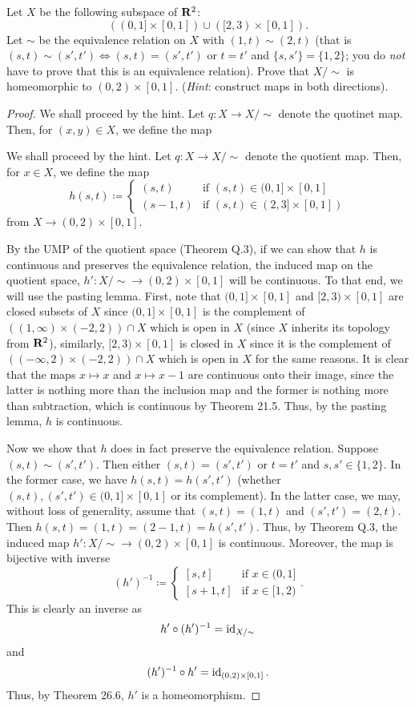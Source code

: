 \begin{problem}
Let $X$ be the following subspace of $\mathbf{R}^2$:
\[
((0,1]\times[0,1])\cup([2,3)\times[0,1]).
\]
Let $\sim$ be the equivalence relation on $X$ with $(1,t)\sim(2,t)$ (that
is $(s,t)\sim(s',t')\iff(s,t)=(s',t')$ or $t=t'$ and $\{s,s'\}=\{1,2\}$;
you do \emph{not} have to prove that this is an equivalence
relation). Prove that $X/{\sim}$ is homeomorphic to
$(0,2)\times[0,1]$. (\emph{Hint}: construct maps in both directions).
\end{problem}
\begin{proof}
We shall proceed by the hint. Let $q\colon X\to X/{\sim}$ denote the
quotinet map. Then, for $(x,y)\in X$, we define the map

We shall proceed by the hint. Let $q\colon X\to X/{\sim}$ denote the
quotient map. Then, for $x\in X$, we define the map
\[
h(s,t)\coloneqq
\begin{cases}
(s,t)&\text{if $(s,t)\in(0,1]\times[0,1]$}\\
(s-1,t)&\text{if $(s,t)\in(2,3]\times[0,1])$}
\end{cases}
\]
from $X\to(0,2)\times[0,1]$.

By the UMP of the quotient space (Theorem Q.3), if we can show that $h$ is
continuous and preserves the equivalence relation, the induced map on the
quotient space, $h'\colon X/{\sim}\to (0,2)\times[0,1]$ will be
continuous. To that end, we will use the pasting lemma. First, note that
$(0,1]\times[0,1]$ and $[2,3)\times[0,1]$ are closed subsets of $X$ since
$(0,1]\times[0,1]$ is the complement of $((1,\infty)\times (-2,2))\cap X$
which is open in $X$ (since $X$ inherits its topology from $\mathbf{R}^2$),
similarly, $[2,3)\times[0,1]$ is closed in $X$ since it is the complement
of $((-\infty,2)\times(-2,2))\cap X$ which is open in $X$ for the same
reasons. It is clear that the maps $x\mapsto x$ and $x\mapsto x-1$ are
continuous onto their image, since the latter is nothing more than the
inclusion map and the former is nothing more than subtraction, which is
continuous by Theorem 21.5. Thus, by the pasting lemma, $h$ is continuous.

Now we show that $h$ does in fact preserve the equivalence
relation. Suppose $(s,t)\sim(s',t')$. Then either $(s,t)=(s',t')$ or $t=t'$
and $s,s'\in\{1,2\}$. In the former case, we have $h(s,t)=h(s',t')$
(whether $(s,t),(s',t')\in(0,1]\times[0,1]$ or its complement). In the
latter case, we may, without loss of generality, assume that $(s,t)=(1,t)$
and $(s',t')=(2,t)$. Then $h(s,t)=(1,t)=(2-1,t)=h(s',t')$. Thus, by Theorem
Q.3, the induced map $h'\colon X/{\sim}\to(0,2)\times[0,1]$ is
continuous. Moreover, the map is bijective with inverse
\[
(h')^{-1}\coloneqq
\begin{cases}
[s,t]&\text{if $x\in (0,1]$}\\
[s+1,t]&\text{if $x\in [1,2)$}
\end{cases}.
\]
This is clearly an inverse as
\[
h'\circ (h')^{-1}=\operatorname{id}_{X/{\sim}}
\]
and
\[
(h')^{-1}\circ h'=\operatorname{id}_{(0,2)\times[0,1]}.
\]
Thus, by Theorem 26.6, $h'$ is a homeomorphism.
\end{proof}

